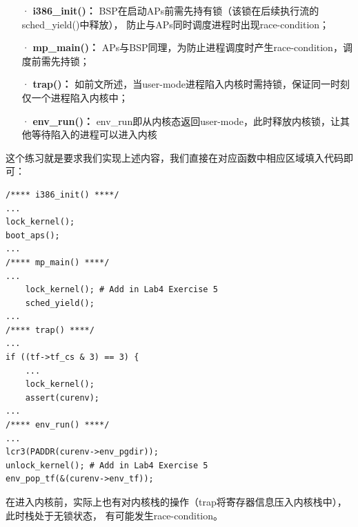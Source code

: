 \documentclass[12pt, letterpaper]{report}
\begin{document}
\begin{itemize}
    \item[·]\textbf{i386\_init()：}
    BSP在启动APs前需先持有锁（该锁在后续执行流的sched\_yield()中释放），
    防止与APs同时调度进程时出现race-condition；
    \item[·]\textbf{mp\_main()：}
    APs与BSP同理，为防止进程调度时产生race-condition，调度前需先持锁；
    \item[·]\textbf{trap()：}
    如前文所述，当user-mode进程陷入内核时需持锁，保证同一时刻仅一个进程陷入内核中；
    \item[·]\textbf{env\_run()：}
    env\_run即从内核态返回user-mode，此时释放内核锁，让其他等待陷入的进程可以进入内核
\end{itemize}

这个练习就是要求我们实现上述内容，我们直接在对应函数中相应区域填入代码即可：\par 
\lstset{style=CStyle}
\setmainfont{Consolas}
\begin{lstlisting}
/**** i386_init() ****/
...
lock_kernel();
boot_aps(); 
...
/**** mp_main() ****/
...
    lock_kernel(); # Add in Lab4 Exercise 5
    sched_yield();
...
/**** trap() ****/
...
if ((tf->tf_cs & 3) == 3) {
    ...
    lock_kernel();
    assert(curenv);
...
/**** env_run() ****/
...
lcr3(PADDR(curenv->env_pgdir));
unlock_kernel(); # Add in Lab4 Exercise 5
env_pop_tf(&(curenv->env_tf));
\end{lstlisting}
\setmainfont{Times New Roman}

\newpage
{}
在进入内核前，实际上也有对内核栈的操作（trap将寄存器信息压入内核栈中），此时栈处于无锁状态，
有可能发生race-condition。\par 
\end{document}
